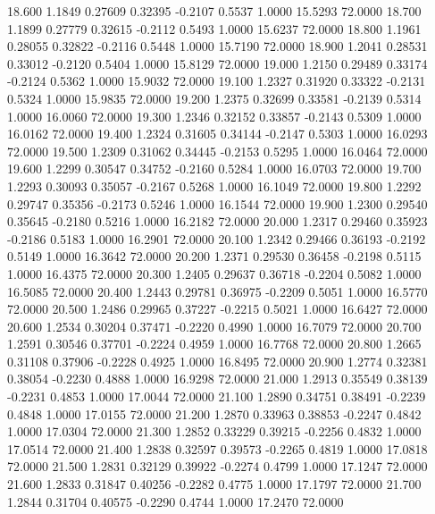   18.600   1.1849   0.27609   0.32395  -0.2107   0.5537   1.0000  15.5293  72.0000
  18.700   1.1899   0.27779   0.32615  -0.2112   0.5493   1.0000  15.6237  72.0000
  18.800   1.1961   0.28055   0.32822  -0.2116   0.5448   1.0000  15.7190  72.0000
  18.900   1.2041   0.28531   0.33012  -0.2120   0.5404   1.0000  15.8129  72.0000
  19.000   1.2150   0.29489   0.33174  -0.2124   0.5362   1.0000  15.9032  72.0000
  19.100   1.2327   0.31920   0.33322  -0.2131   0.5324   1.0000  15.9835  72.0000
  19.200   1.2375   0.32699   0.33581  -0.2139   0.5314   1.0000  16.0060  72.0000
  19.300   1.2346   0.32152   0.33857  -0.2143   0.5309   1.0000  16.0162  72.0000
  19.400   1.2324   0.31605   0.34144  -0.2147   0.5303   1.0000  16.0293  72.0000
  19.500   1.2309   0.31062   0.34445  -0.2153   0.5295   1.0000  16.0464  72.0000
  19.600   1.2299   0.30547   0.34752  -0.2160   0.5284   1.0000  16.0703  72.0000
  19.700   1.2293   0.30093   0.35057  -0.2167   0.5268   1.0000  16.1049  72.0000
  19.800   1.2292   0.29747   0.35356  -0.2173   0.5246   1.0000  16.1544  72.0000
  19.900   1.2300   0.29540   0.35645  -0.2180   0.5216   1.0000  16.2182  72.0000
  20.000   1.2317   0.29460   0.35923  -0.2186   0.5183   1.0000  16.2901  72.0000
  20.100   1.2342   0.29466   0.36193  -0.2192   0.5149   1.0000  16.3642  72.0000
  20.200   1.2371   0.29530   0.36458  -0.2198   0.5115   1.0000  16.4375  72.0000
  20.300   1.2405   0.29637   0.36718  -0.2204   0.5082   1.0000  16.5085  72.0000
  20.400   1.2443   0.29781   0.36975  -0.2209   0.5051   1.0000  16.5770  72.0000
  20.500   1.2486   0.29965   0.37227  -0.2215   0.5021   1.0000  16.6427  72.0000
  20.600   1.2534   0.30204   0.37471  -0.2220   0.4990   1.0000  16.7079  72.0000
  20.700   1.2591   0.30546   0.37701  -0.2224   0.4959   1.0000  16.7768  72.0000
  20.800   1.2665   0.31108   0.37906  -0.2228   0.4925   1.0000  16.8495  72.0000
  20.900   1.2774   0.32381   0.38054  -0.2230   0.4888   1.0000  16.9298  72.0000
  21.000   1.2913   0.35549   0.38139  -0.2231   0.4853   1.0000  17.0044  72.0000
  21.100   1.2890   0.34751   0.38491  -0.2239   0.4848   1.0000  17.0155  72.0000
  21.200   1.2870   0.33963   0.38853  -0.2247   0.4842   1.0000  17.0304  72.0000
  21.300   1.2852   0.33229   0.39215  -0.2256   0.4832   1.0000  17.0514  72.0000
  21.400   1.2838   0.32597   0.39573  -0.2265   0.4819   1.0000  17.0818  72.0000
  21.500   1.2831   0.32129   0.39922  -0.2274   0.4799   1.0000  17.1247  72.0000
  21.600   1.2833   0.31847   0.40256  -0.2282   0.4775   1.0000  17.1797  72.0000
  21.700   1.2844   0.31704   0.40575  -0.2290   0.4744   1.0000  17.2470  72.0000
